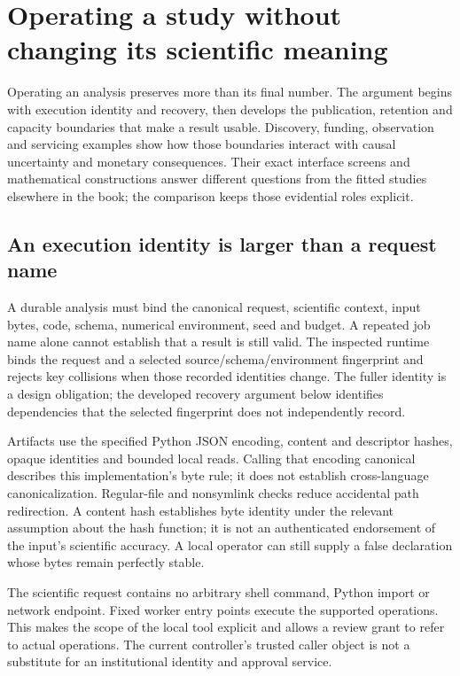 \chapter{Operating a study without changing its scientific meaning}
\label{in:operations}

Operating an analysis preserves more than its final number. The argument begins with execution identity and recovery, then develops the publication, retention and capacity boundaries that make a result usable. Discovery, funding, observation and servicing examples show how those boundaries interact with causal uncertainty and monetary consequences. Their exact interface screens and mathematical constructions answer different questions from the fitted studies elsewhere in the book; the comparison keeps those evidential roles explicit.

\section{An execution identity is larger than a request name}

A durable analysis must bind the canonical request, scientific context, input
bytes, code, schema, numerical environment, seed and budget. A repeated job
name alone cannot establish that a result is still valid. The inspected runtime binds the request and a selected source/schema/environment fingerprint and rejects key collisions when those recorded identities change. The fuller identity is a design obligation; the developed recovery argument below identifies dependencies that the selected fingerprint does not independently record.~\citep{v12_in_runtime}

Artifacts use the specified Python JSON encoding, content and descriptor hashes, opaque identities and bounded local reads. Calling that encoding canonical describes this implementation's byte rule; it does not establish cross-language canonicalization. Regular-file and nonsymlink checks reduce accidental
path redirection. A content hash establishes byte identity under the relevant
assumption about the hash function; it is not an authenticated endorsement of
the input's scientific accuracy. A local operator can still supply a false
declaration whose bytes remain perfectly stable.

The scientific request contains no arbitrary shell command, Python import or
network endpoint. Fixed worker entry points execute the supported operations.
This makes the scope of the local tool explicit and allows a review grant to
refer to actual operations. The current controller's trusted caller object is
not a substitute for an institutional identity and approval service.

